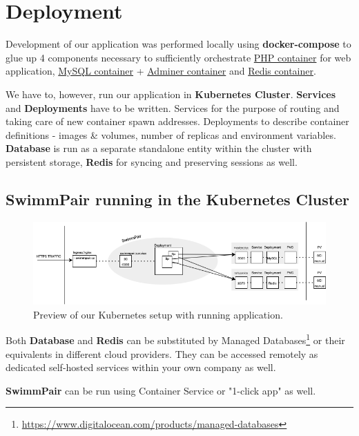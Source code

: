 \chapter{Deployment}
Development of our application was performed locally using \textbf{docker-compose} to glue up 4 components necessary to sufficiently orchestrate \underline{PHP container} for web application, \underline{MySQL container} + \underline{Adminer container} and \underline{Redis container}.
\par
We have to, however, run our application in \textbf{Kubernetes Cluster}. \textbf{Services} and \textbf{Deployments} have to be written. Services for the purpose of routing and taking care of new container spawn addresses. Deployments to describe container definitions - images \& volumes, number of replicas and environment variables. \textbf{Database} is run as a separate standalone entity within the cluster with persistent storage, \textbf{Redis} for syncing and preserving sessions as well.
\newline
\par
\section*{SwimmPair running in the Kubernetes Cluster}
\par
\begin{figure}[h]
    \centering	
    \includegraphics[scale=0.52]{img/swimmpair_deployment_k8s.png}
    \caption{Preview of our Kubernetes setup with running application.}
    \label{fig5.1:deplk8s}
\end{figure}
Both \textbf{Database} and \textbf{Redis} can be substituted by Managed Databases\footnote{\url{https://www.digitalocean.com/products/managed-databases}} or their equivalents in different cloud providers. They can be accessed remotely as dedicated self-hosted services within your own company as well.
\par \textbf{SwimmPair} can be run using Container Service or "1-click app" as well. 
